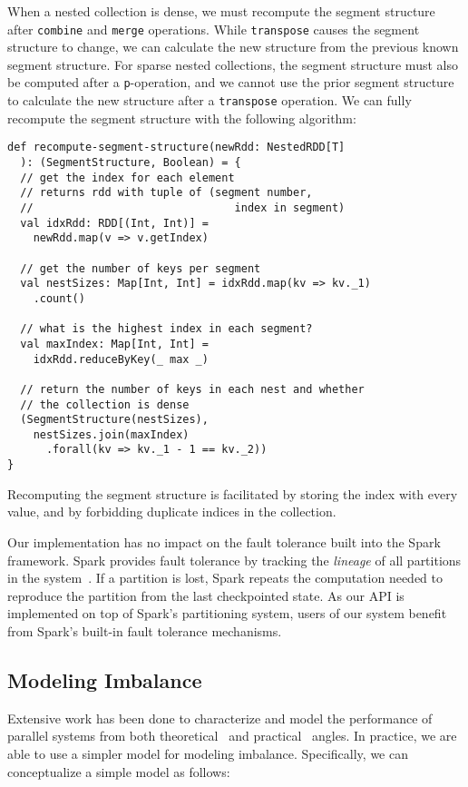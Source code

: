 \documentclass[preprint]{sigplanconf}
\theoremstyle{definition}
\begin{document}
When a nested collection is dense, we must recompute the segment structure after \texttt{combine} and
\texttt{merge} operations. While \texttt{transpose} causes the segment structure to change, we can
calculate the new structure from the previous known segment structure. For sparse nested collections,
the segment structure must also be computed after a \texttt{p}-operation, and we cannot use the prior
segment structure to calculate the new structure after a \texttt{transpose} operation. We can fully
recompute the segment structure with the following algorithm:

\begin{lstlisting}
def recompute-segment-structure(newRdd: NestedRDD[T]
  ): (SegmentStructure, Boolean) = {
  // get the index for each element
  // returns rdd with tuple of (segment number, 
  //                               index in segment)
  val idxRdd: RDD[(Int, Int)] = 
    newRdd.map(v => v.getIndex)
  
  // get the number of keys per segment
  val nestSizes: Map[Int, Int] = idxRdd.map(kv => kv._1)
    .count()
    
  // what is the highest index in each segment?
  val maxIndex: Map[Int, Int] = 
    idxRdd.reduceByKey(_ max _)
  
  // return the number of keys in each nest and whether
  // the collection is dense
  (SegmentStructure(nestSizes),
    nestSizes.join(maxIndex)
      .forall(kv => kv._1 - 1 == kv._2))
}
\end{lstlisting}

Recomputing the segment structure is facilitated by storing the index with every value, and by forbidding
duplicate indices in the collection.

Our implementation has no impact on the fault tolerance built into the Spark framework. Spark provides
fault tolerance by tracking the \emph{lineage} of all partitions in the system~\cite{zaharia12}. If a
partition is lost, Spark repeats the computation needed to reproduce the partition from the last
checkpointed state. As our API is implemented on top of Spark's partitioning system, users of our
system benefit from Spark's built-in fault tolerance mechanisms.

\subsection{Modeling Imbalance}
\label{sec:imbalance}

Extensive work has been done to characterize and model the performance of parallel systems from both
theoretical~\cite{blelloch90thesis} and practical~\cite{herodotou11, zaharia08} angles. In practice, we
are able to use a simpler model for modeling imbalance. Specifically, we can conceptualize a simple
model as follows:
\end{document}
